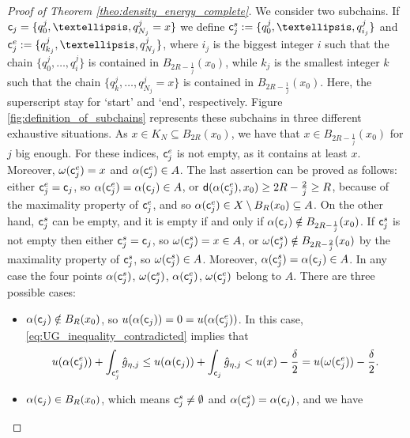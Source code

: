 \documentclass[12pt]{amsart}
\newcommand{\sfd}{{\sf d}}
\newcommand{\X}{{\rm X}}
\theoremstyle{definition}
\newcommand{\sfc}{{\sf c}}
\begin{document}
\begin{proof}[Proof of Theorem \ref{theo:density_energy_complete}]
    We consider two subchains. If $\sfc_j = \{q_0^j, \ldots, q_{N_j}^j = x\}$ we define $\sfc_j^s := \{q_0^j,\ldots,q_{i_j}^j\}$ and $\sfc_j^e := \{q_{k_j}^j,\ldots,q_{N_j}^j\}$, where $i_j$ is the biggest integer $i$ such that the chain $\{ q_0^j,\ldots,q_{i}^j \}$ is contained in $B_{2R - \frac{1}{j}}(x_0)$, while
    $k_j$ is the smallest integer $k$ such that the chain $\{q_{k}^j,\ldots,q_{N_j}^j = x\}$ is contained in $B_{2R - \frac{1}{j}}(x_0)$. Here, the superscript stay for `start' and `end', respectively. Figure \ref{fig:definition_of_subchains} represents these subchains in three different exhaustive situations. As $x\in K_N \subseteq B_{2R}(x_0)$, we have that $x \in B_{2R - \frac{1}{j}}(x_0)$ for $j$ big enough. For these indices, $\sfc_j^e$ is not empty, as it contains at least $x$. Moreover, $\omega(\sfc_j^e) = x$ and $\alpha(\sfc_j^e) \in A$. The last assertion can be proved as follows: either $\sfc_j^e = \sfc_j$, so $\alpha(\sfc_j^e) = \alpha(\sfc_j) \in A$, or $\sfd(\alpha(\sfc_j^e), x_0) \ge 2R - \frac{2}{j} \ge R$, because of the maximality property of $\sfc_j^e$, and so $\alpha(\sfc_j^e) \in \X \setminus B_{R}(x_0) \subseteq A$. On the other hand, $\sfc_j^s$ can be empty, and it is empty if and only if $\alpha(\sfc_j) \notin B_{2R - \frac{1}{j}}(x_0)$. If $\sfc_j^s$ is not empty then either $\sfc_j^s = \sfc_j$, so $\omega(\sfc_j^s) = x \in A$, or $\omega(\sfc_j^s) \notin B_{2R - \frac{2}{j}}(x_0)$ by the maximality property of $\sfc_j^s$, so $\omega(\sfc_j^s) \in A$. Moreover, $\alpha(\sfc_j^s) = \alpha(\sfc_j) \in A$. In any case the four points $\alpha(\sfc_j^s)$, $\omega(\sfc_j^s)$, $\alpha(\sfc_j^e)$, $\omega(\sfc_j^e)$ belong to $A$.
    There are three possible cases:
    \begin{itemize}
        \item[(1)] $\alpha(\sfc_j) \notin B_{R}(x_0)$, so $u(\alpha(\sfc_j)) = 0 = u(\alpha(\sfc_j^e))$. In this case, \eqref{eq:UG_inequality_contradicted} implies that
        \begin{equation}
            \label{eq:UG_inequality_contradicted_case_1}
            u(\alpha(\sfc_j^e)) + \int_{\sfc_j^e} \hat{g}_{\eta,j} \le u(\alpha(\sfc_j)) + \int_{\sfc_j} \hat{g}_{\eta,j} < u(x) - \frac{\delta}{2} = u(\omega(\sfc_j^e)) - \frac{\delta}{2}.
        \end{equation}
        \item[(2)] $\alpha(\sfc_j) \in B_{R}(x_0)$, which means $\sfc_j^s \neq \emptyset$ and $\alpha(\sfc_j^s) = \alpha(\sfc_j)$, and we have
        \begin{equation}

\end{equation}
\end{itemize}
\end{proof}
\end{document}
